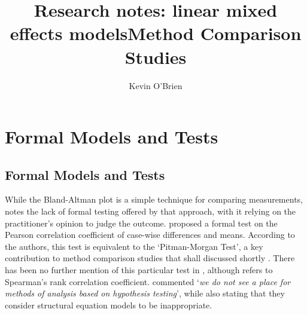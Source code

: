 \documentclass[12pt, a4paper]{report}
\title{Research notes: linear mixed effects models}
\author{ } \date{ }
\theoremstyle{plain}
\theoremstyle{definition}
\theoremstyle{remark}
\begin{document}
	\author{Kevin O'Brien}
	\title{Method Comparison Studies}
	
	
	\tableofcontents
	
	
	
	
\chapter{Formal Models and Tests}


\section{Formal Models and Tests}
While the Bland-Altman plot is a simple technique for comparing measurements, \citet{Kinsella} notes the lack of formal testing offered by
that approach, with it relying on the practitioner's opinion to judge the outcome. \citet{BA83} proposed a formal test on the
Pearson correlation coefficient of case-wise differences and means. According to the authors, this test is equivalent
to the `Pitman-Morgan Test', a key contribution to method comparison studies that shall discussed shortly \citep{morgan, pitman}. There has been no further mention of this particular test in
\citet{BA86}, although \citet{BA99} refers to Spearman's rank
correlation coefficient. \citet{BA99} commented `\textit{we do not see a
place for methods of analysis based on hypothesis testing}', while also stating that they consider structural equation models to be inappropriate.
\end{document}
